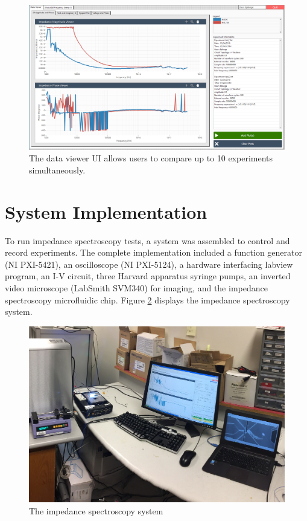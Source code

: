 \begin{figure}[h]
    \centering
    \includegraphics[width=\textwidth]{images/labview_dataViewer.png}
    \caption[Data viewer UI.]{The data viewer UI allows users to compare up to 10 experiments simultaneously.}
    \label{fig:labview_data_viewer_gui}
\end{figure}

\section{System Implementation}
\par To run impedance spectroscopy tests, a system was assembled to control and record experiments. The complete implementation included a function generator (NI PXI-5421), an oscilloscope (NI PXI-5124), a hardware interfacing labview program, an I-V circuit, three Harvard apparatus syringe pumps, an inverted video microscope (LabSmith SVM340) for imaging, and the impedance spectroscopy microfluidic chip. Figure \ref{fig:IS_system} displays the impedance spectroscopy system. 

\begin{figure}[h]
    \centering
    \includegraphics[width=\textwidth]{images/impedance_system}
    \caption{The impedance spectroscopy system}
    \label{fig:IS_system}
\end{figure}

